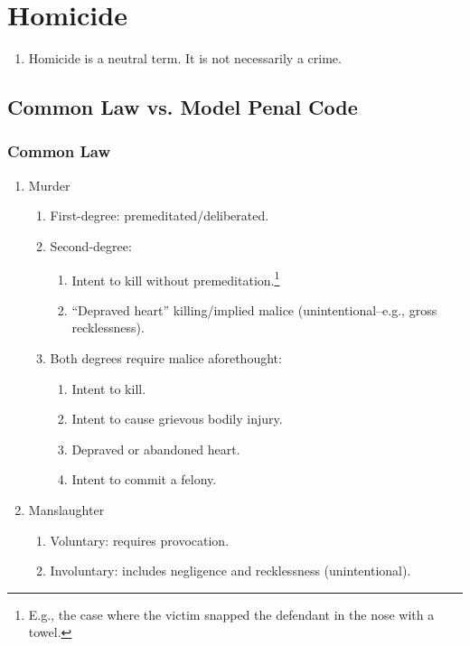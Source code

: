 \section{Homicide}

\begin{enumerate}
    \item Homicide is a neutral term. It is not necessarily a crime.
\end{enumerate}

\subsection{Common Law vs. Model Penal Code}

\subsubsection{Common Law}

\begin{enumerate}
    \item Murder
    \begin{enumerate}
        \item First-degree: premeditated/deliberated.
        \item Second-degree:
        \begin{enumerate}
            \item Intent to kill without premeditation.\footnote{E.g., the case where the victim snapped the defendant in the nose with a towel.}
            \item ``Depraved heart'' killing/implied malice (unintentional--e.g., gross recklessness).
        \end{enumerate}
        \item Both degrees require malice aforethought:
        \begin{enumerate}
            \item Intent to kill.
            \item Intent to cause grievous bodily injury.
            \item Depraved or abandoned heart.
            \item Intent to commit a felony.
        \end{enumerate}
    \end{enumerate}
    \item Manslaughter
    \begin{enumerate}
        \item Voluntary: requires provocation.
        \item Involuntary: includes negligence and recklessness (unintentional).
    \end{enumerate}
\end{enumerate}

